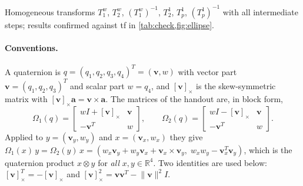 \documentclass[a4paper]{tufte-handout}
\begin{document}
\begin{evidence}
Homogeneous transforms $T^w_1$, $T^w_2$, $(T^w_1)^{-1}$, $T^1_2$, $T^1_p$,
$(T^1_p)^{-1}$ with all intermediate steps; results confirmed against tf in
\cref{tab:check,fig:ellipse}.
\end{evidence}


\paragraph{Conventions.}
A quaternion is $q = (q_1, q_2, q_3, q_4)^T = (\bm v, w)$ with vector part
$\bm v = (q_1, q_2, q_3)^T$ and scalar part $w = q_4$, and
$[\bm v]_\times$ is the skew-symmetric matrix with
$[\bm v]_\times \bm a = \bm v \times \bm a$.
The matrices of the handout\cite{vnav2023lab2} are, in block form,
\begin{equation*}
\Omega_1(q) = \begin{bmatrix} w I + [\bm v]_\times & \bm v\\ -\bm v^T & w \end{bmatrix},
\qquad
\Omega_2(q) = \begin{bmatrix} w I - [\bm v]_\times & \bm v\\ -\bm v^T & w \end{bmatrix}.
\end{equation*}
Applied to $y = (\bm v_y, w_y)$ and $x = (\bm v_x, w_x)$ they give
$\Omega_1(x)\,y = \Omega_2(y)\,x
= (w_x \bm v_y + w_y \bm v_x + \bm v_x \times \bm v_y,\; w_x w_y - \bm v_x^T\bm v_y)$,
which is the quaternion product $x \otimes y$ for \emph{all} $x, y \in \mathbb{R}^4$.
Two identities are used below:
$[\bm v]_\times^T = -[\bm v]_\times$ and
$[\bm v]_\times^2 = \bm v\bm v^T - \lVert\bm v\rVert^2 I$.
\end{document}
